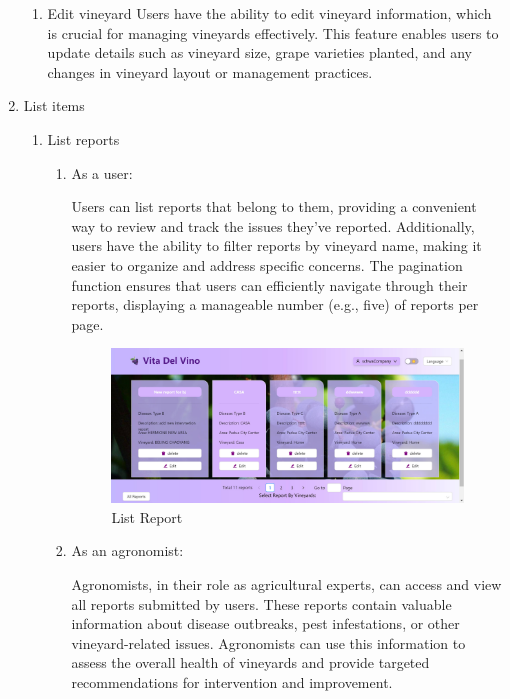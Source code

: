 \begin{enumerate}
\begin{enumerate}
              \item Edit vineyard
                    Users have the ability to edit vineyard information, which is crucial for managing vineyards effectively. This feature enables users to update details such as vineyard size, grape varieties planted, and any changes in vineyard layout or management practices.
       \end{enumerate}
    \item  List items
          \begin{enumerate}
              \item List reports
                    \begin{enumerate}
                        \item As a user:

                              Users can list reports that belong to them, providing a convenient way to review and track the issues they've reported. Additionally, users have the ability to filter reports by vineyard name, making it easier to organize and address specific concerns. The pagination function ensures that users can efficiently navigate through their reports, displaying a manageable number (e.g., five) of reports per page.

                                \begin{figure}
                                    \centering
                                    \includegraphics[width=1\linewidth]{images/ListReport.jpg}
                                    \caption{List Report}
                                    \label{fig:ListReport}
                                \end{figure}

                              
                        \item As an agronomist:

                              Agronomists, in their role as agricultural experts, can access and view all reports submitted by users. These reports contain valuable information about disease outbreaks, pest infestations, or other vineyard-related issues. Agronomists can use this information to assess the overall health of vineyards and provide targeted recommendations for intervention and improvement.


\end{enumerate}
\end{enumerate}
\end{enumerate}
